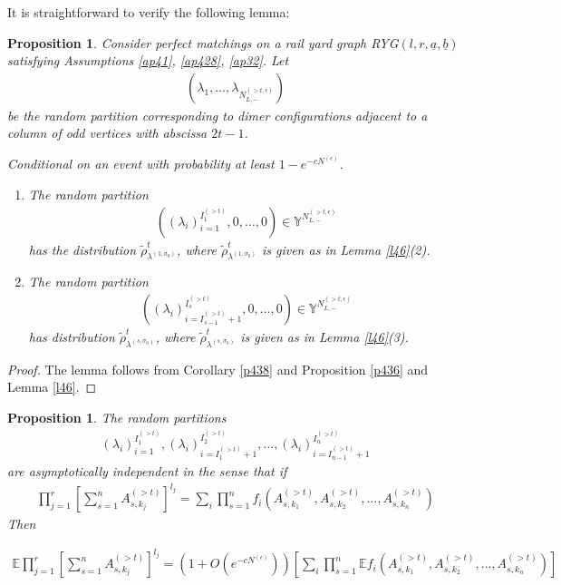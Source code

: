 \documentclass[11pt]{amsart}
\theoremstyle{plain}
\newtheorem{proposition}[theorem]{Proposition}
\theoremstyle{definition}
\theoremstyle{remark}
\newcommand\si{\sigma}
\newcommand\YY{\mathbb{Y}}
\numberwithin{equation}{section}
\numberwithin{theorem}{section}
\numberwithin{figure}{section}
\begin{document}
It is straightforward to verify the following lemma:
\begin{proposition}\label{le61}Consider perfect matchings on a rail yard graph RYG$(l,r,\underline{a},\underline{b})$ satisfying Assumptions \ref{ap41}, \ref{ap428}, \ref{ap32}. Let
\begin{align*}
\left(\lambda_1,\ldots,\lambda_{N_{L,-}^{(>t,\epsilon)}}\right)
\end{align*}
be the random partition corresponding to dimer configurations adjacent to a column of odd vertices with abscissa $2t-1$.

Conditional on an event with probability at least $1-e^{-cN^{(\epsilon)}}$. 
\begin{enumerate}
\item The random partition
\begin{align*}
((\lambda_i)_{i=1}^{I_1^{(>t)}},0,\ldots,0)\in \YY^{N_{L,-}^{(>t,\epsilon)}}
\end{align*}
has the distribution 
$\tilde{\rho}^t_{\lambda^{(1,\si_0)}}$, where $\tilde{\rho}^t_{\lambda^{(1,\si_0)}}$ is given as in Lemma \ref{l46}(2).
\item 

The random partition
\begin{align*}
((\lambda_i)_{i=I_{s-1}^{(>t)}+1}^{I_s^{(>t)}},0,\ldots,0)\in \YY^{N_{L,-}^{(>t,\epsilon)}}
\end{align*}
has distribution $\tilde{\rho}^t_{\lambda^{(s,\si_0)}}$, where $\tilde{\rho}^t_{\lambda^{(s,\si_0)}}$ is given as in Lemma \ref{l46}(3).
\end{enumerate}
\end{proposition}

\begin{proof}The lemma follows from Corollary \ref{p438} and Proposition \ref{p436} and Lemma \ref{l46}.
\end{proof}

\begin{proposition}\label{p62}The random partitions 
\begin{align*}
(\lambda_i)_{i=1}^{I_1^{(>t)}}, (\lambda_i)_{i=I_{1}^{(>t)}+1}^{I_2^{(>t)}},\ldots, (\lambda_i)_{i=I_{n-1}^{(>t)}+1}^{I_n^{(>t)}}
\end{align*}
are asymptotically independent in the sense that if 
\begin{align*}
\prod_{j=1}^{r}\left[\sum_{s=1}^{n}A_{s,k_j}^{(>t)}\right]^{l_j}=\sum_i \prod_{s=1}^n f_i(A_{s,k_1}^{(>t)},A_{s,k_2}^{(>t)},\ldots,A_{s,k_n}^{(>t)} )
\end{align*}
Then
\begin{small}
\begin{align*}
\mathbb{E}\prod_{j=1}^{r}\left[\sum_{s=1}^{n}A_{s,k_j}^{(>t)}\right]^{l_j}=\left(1+O(e^{-cN^{(\epsilon)}})\right)\left[\sum_i \prod_{s=1}^n \mathbb{E}f_i(A_{s,k_1}^{(>t)},A_{s,k_2}^{(>t)},\ldots,A_{s,k_n}^{(>t)} )\right]
\end{align*}
\end{small}
\end{proposition}
\end{document}
